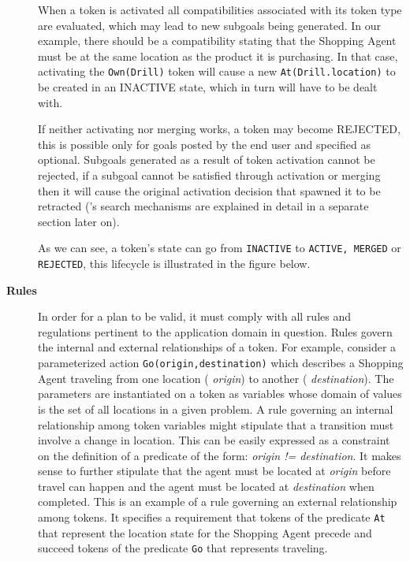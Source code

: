 \begin{description}
When a token is activated all compatibilities associated with its
token type are evaluated, which may lead to new subgoals being
generated. In our example, there should be a compatibility stating
that the Shopping Agent must be at the same location as the product it
is purchasing. In that case, activating the \texttt{Own(Drill)} token
will cause a new \texttt{At(Drill.location)} to be created in an
INACTIVE state, which in turn will have to be dealt with.


If neither activating nor merging works, a token may become REJECTED,
this is possible only for goals posted by the end user and specified
as optional. Subgoals generated as a result of token activation cannot
be rejected, if a subgoal cannot be satisfied through activation or
merging then it will cause the original activation decision that
spawned it to be retracted (\eu's search mechanisms are explained in
detail in a separate section later on).

As we can see, a token's state can go from \texttt{INACTIVE} to
\texttt{ACTIVE, MERGED} or \texttt{REJECTED}, this lifecycle is
illustrated in the figure below.


\item[\textbf{Rules}] In order for a plan to be valid, it must comply
  with all rules and regulations pertinent to the application domain
  in question. Rules govern the internal and external relationships of
  a token. For example, consider a parameterized action
  \texttt{Go(origin,destination)} which describes a Shopping Agent
  traveling from one location ( \textit{origin}) to another (
  \textit{destination}). The parameters are instantiated on a token as
  variables whose domain of values is the set of all locations in a
  given problem. A rule governing an internal relationship among token
  variables might stipulate that a transition must involve a change in
  location. This can be easily expressed as a constraint on the
  definition of a predicate of the form: \textit{origin !=
    destination}. It makes sense to further stipulate that the agent
  must be located at \textit{origin} before travel can happen and the
  agent must be located at \textit{destination} when completed. This
  is an example of a rule governing an external relationship among
  tokens. It specifies a requirement that tokens of the predicate
  \texttt{At} that represent the location state for the Shopping Agent
  precede and succeed tokens of the predicate \texttt{Go} that
  represents traveling.


\end{description}
